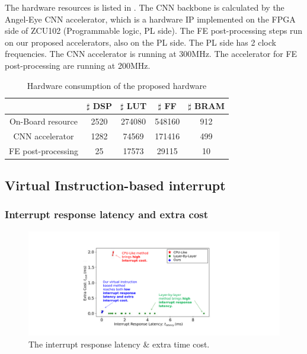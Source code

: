 The hardware resources is listed in . The CNN backbone is calculated by the Angel-Eye CNN accelerator\cite{guo2017angel}, which is a hardware IP implemented on the FPGA side of ZCU102 (Programmable logic, PL side). The FE post-processing steps run on our proposed accelerators, also on the PL side. The PL side has 2 clock frequencies. The CNN accelerator is running at 300MHz. The accelerator for FE post-processing are running at 200MHz.

\begin{table}[t]
  \centering
  \setlength{\abovecaptionskip}{2pt}
  \caption{Hardware consumption of the proposed hardware}
\begin{tabular}{|c|c|c|c|c|}
  \hline
        & $\sharp$ DSP & $\sharp$ LUT & $\sharp$ FF & $\sharp$ BRAM \\
  \hline
  On-Board resource &   2520   &  274080      &  548160     & 912 \\
  \hline
  CNN accelerator &   1282   &  74569      &   171416    & 499 \\
  \hline
  FE post-processing & 25      &  17573     &   29115    & 10 \\
  \hline
  \end{tabular}%
  
  \label{tab:hardware}%
\end{table}%


\subsection{Virtual Instruction-based interrupt }

\subsubsection{ Interrupt response latency and extra cost}

\begin{figure}[t]
  \centering
  \vspace{-0.1cm} 
  \setlength{\abovecaptionskip}{0cm} 
  \setlength{\belowcaptionskip}{-0.05cm} 
  \includegraphics[width=0.99\linewidth]{fig/PRresult.pdf}
  \caption{The interrupt response latency \& extra time cost.}
  \label{fig:scatter1024}
\end{figure}

